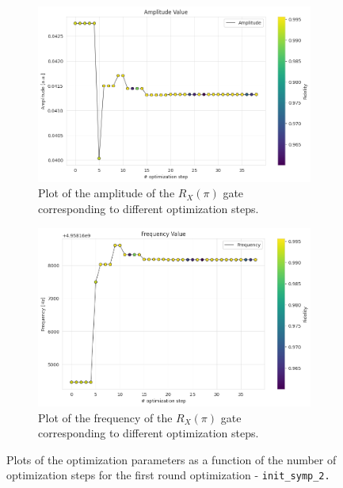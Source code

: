 \begin{figure}[h!]
    \centering
    \begin{subfigure}[t]{0.45\textwidth}
        \includegraphics[width=\textwidth]{figures/png/RB_optimization/NM/InitialSymplex/20241113_181711/Amplitude.png}
        \caption{Plot of the amplitude of the $R_X(\pi)$ gate corresponding to different optimization steps.}
        \label{fig:20241113_181711:amplitude}
    \end{subfigure}
    \hfill
    \begin{subfigure}[t]{0.45\textwidth}
        \includegraphics[width=\textwidth]{figures/png/RB_optimization/NM/InitialSymplex/20241113_181711/Frequency.png}
        \caption{Plot of the frequency of the $R_X(\pi)$ gate corresponding to different optimization steps.}
        \label{fig:20241113_181711:frequency}
    \end{subfigure}
    \caption{Plots of the optimization parameters as a function of the number of optimization steps for the first round optimization - \tt{init\_symp\_2}.}
    \label{fig:20241113_181711:parameters}
\end{figure}

